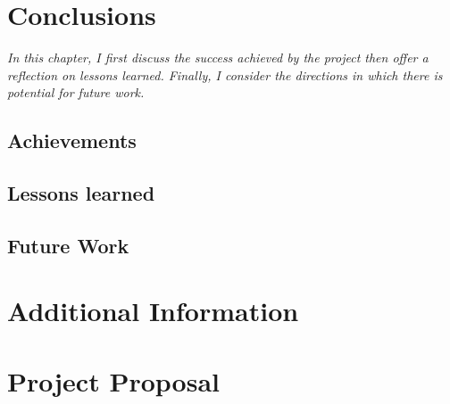 \documentclass[12pt,a4paper,twoside,openright]{report}
\begin{document}
\chapter{Conclusions}
\textit{In this chapter, I first discuss the success achieved by the project then offer a reflection on lessons learned. Finally, I consider the directions in which there is potential for future work.}
\section{Achievements}

\section{Lessons learned}

\section{Future Work}

\cite{finkensiep_modeling_2021}


\nocite{*}
% 




\appendix

\chapter{Additional Information}

%
%
%
%
%


\chapter{Project Proposal}


\end{document}

